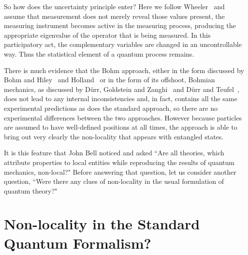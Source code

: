 \documentclass[12pt]{article}
\begin{document}
 So how does the uncertainty principle enter?  Here we follow Wheeler~\cite{jw91}
and assume that measurement does not merely reveal those values present,  the measuring instrument becomes active in the measuring process, producing the appropriate eigenvalue of the operator that is being measured.  In this participatory act, the complementary variables are changed in an uncontrollable way.  Thus the statistical element of a quantum process remains.

There is much evidence that the Bohm approach, either in the form discussed by Bohm and Hiley~\cite{dbbh93} and Holland~\cite{ph95} 
or in the form of its offshoot, Bohmian mechanics,  as discussed by  D\"{u}rr, Goldstein and Zanghi~\cite{dgz96} 
and D\"{u}rr and Teufel~\cite{ddst09}, 
does not lead to any internal inconsistencies and, in fact, contains all the same experimental predictions as does the standard approach, so there are no experimental differences between the two approaches.   However because particles are assumed to have well-defined positions at all times, the approach is able to bring out very clearly the non-locality that appears with entangled states.  

It is this feature that John Bell noticed and asked ``Are all theories, which attribute properties to local entities while reproducing the results of quantum mechanics, non-local?"  Before answering that question, let us consider another question, ``Were there any clues of non-locality in the usual formulation of quantum theory?"

\section{Non-locality in the Standard Quantum Formalism?}
 
\end{document}
